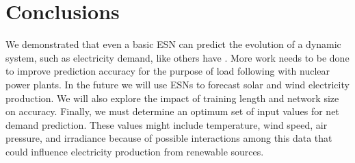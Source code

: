 \section{Conclusions}

We demonstrated that even a basic \gls{ESN} can
predict the evolution of a dynamic system, such as electricity demand, like
others have
\cite{pathak_model-free_2018,wikner_combining_2020,bianchi_reservoir_2020}.
More work needs to be done to improve prediction accuracy for the purpose of
load following with nuclear power plants. In the future we will use \glspl{ESN}
to forecast solar and wind electricity production. We will also explore the
impact of training length and network size on accuracy. Finally, we must
determine an optimum set of input values for net demand prediction. These values
might include temperature, wind speed, air pressure, and irradiance because of
possible interactions among this data that could influence electricity
production from renewable sources.

